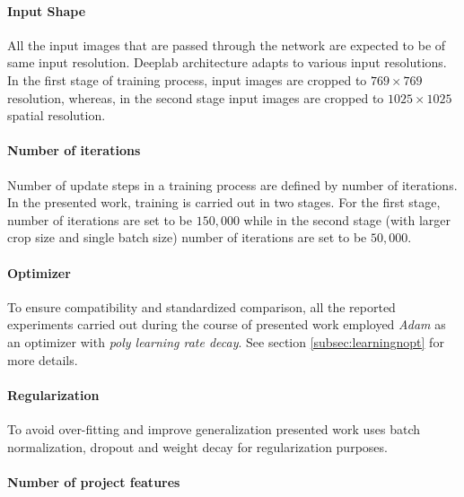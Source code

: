 \paragraph{Input Shape}

All the input images that are passed through the network are expected to be of same input resolution. Deeplab architecture adapts to various input resolutions. In the first stage of training process, input images are cropped to $769\times769$ resolution, whereas, in the second stage input images are cropped to $1025\times1025$ spatial resolution.

\paragraph{Number of iterations}

Number of update steps in a training process are defined by number of iterations. In the presented work, training is carried out in two stages. For the first stage, number of iterations are set to be $150,000$ while in the second stage (with larger crop size and single batch size) number of iterations are set to be $50,000$.

\paragraph{Optimizer}

To ensure compatibility and standardized comparison, all the reported experiments carried out during the course of presented work employed \textit{Adam} as an optimizer \cite{Goodfellow-et-al-2016} with \textit{poly learning rate decay}. See section \ref{subsec:learningnopt} for more details.  


\paragraph{Regularization}

To avoid over-fitting and improve generalization presented work uses batch normalization, dropout and weight decay for regularization purposes. 

\paragraph{Number of project features}

